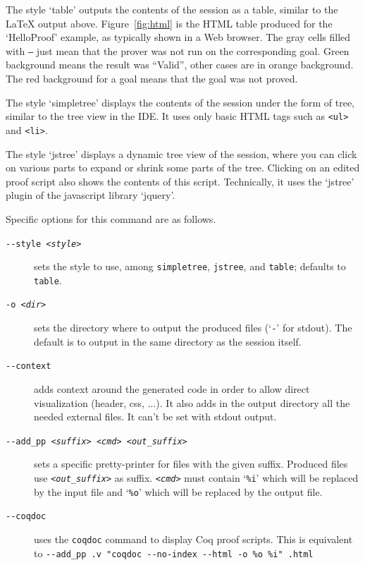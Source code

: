 The style `table' outputs the contents of the session as a table,
similar to the LaTeX output above. Figure~\ref{fig:html} is the HTML
table produced for the `HelloProof' example, as typically shown in a
Web browser. The gray cells filled with \texttt{---} just mean that
the prover was not run on the corresponding goal. Green background
means the result was ``Valid'', other cases are in orange
background. The red background for a goal means that the goal was not
proved.

The style `simpletree' displays the contents of the session under the
form of tree, similar to the tree view in the IDE. It uses only basic
HTML tags such as \verb|<ul>| and \verb|<li>|.

The style `jstree' displays a dynamic tree view of the session, where
you can click on various parts to expand or shrink some parts of the
tree. Clicking on an edited proof script also shows the contents of
this script. Technically, it uses the `jstree' plugin of the javascript
library `jquery'.

Specific options for this command are as follows.
\begin{description}
\item[\texttt{-{}-style \textsl{<style>}}] sets the style to use, among
  \texttt{simpletree}, \texttt{jstree}, and \texttt{table}; defaults to
  \texttt{table}.

\item[\texttt{-o \textsl{<dir>}}] sets the directory where to output
  the produced files (`\texttt{-}' for stdout). The default is to output
  in the same directory as the session itself.

\item[\texttt{-{}-context}] adds context around the generated code in
  order to allow direct visualization (header, css, ...). It also adds
  in the output directory all the needed external files. It can't be set with
  stdout output.

\item[\texttt{-{}-add\_pp \textsl{<suffix>} \textsl{<cmd>} \textsl{<out\_suffix>}}] sets a specific
  pretty-printer for files with the given suffix. Produced files use
  \texttt{\textsl{<out\_suffix>}} as suffix. \texttt{\textsl{<cmd>}} must contain
  `\texttt{\%i}' which will be replaced by the input file and
  `\texttt{\%o}' which will be replaced by the output file.

\item[\texttt{-{}-coqdoc}] uses the \verb|coqdoc| command to display Coq proof
  scripts. This is equivalent to \texttt{-{}-add\_pp .v "coqdoc
    -{}-no-index -{}-html -o \%o \%i" .html}

\end{description}

